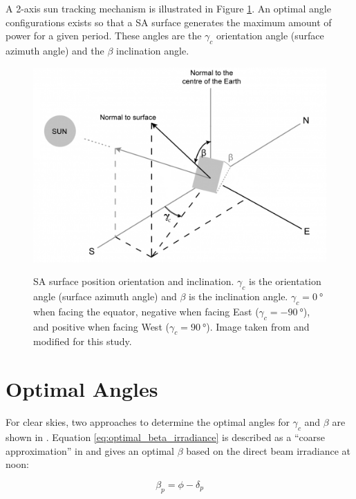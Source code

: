 A 2-axis sun tracking mechanism is illustrated in Figure \ref{fig:tilted-surface-sun-tracking}. An optimal angle configurations exists so that a \ac{SA} surface generates the maximum amount of power for a given period. These angles are the $\gamma_{c}$ orientation angle (surface azimuth angle) and the $\beta$ inclination angle.

\begin{figure}[h]
  \centering
  \hypersetup{linkcolor=captionTextColor}
  \includegraphics[width=0.7\linewidth]{sections/appendix/optimal-angles/images/beta-and-gamma-angles-on-tilted-surface.png}\\
  \caption[\ac{SA} surface position orientation and inclination]
          {\ac{SA} surface position orientation and inclination. $\gamma_{c}$ is the orientation angle (surface azimuth angle) and $\beta$ is the inclination angle. $\gamma_{c} = \SI{0}{\degree}$ when facing the equator, negative when facing East ($\gamma_{c} = \SI{-90}{\degree}$), and positive when facing West ($\gamma_{c} = \SI{+90}{\degree}$). Image taken from  and modified for this study.}
  \label{fig:tilted-surface-sun-tracking}
\end{figure}

\section{Optimal Angles}
For clear skies, two approaches to determine the optimal angles for $\gamma_{c}$ and $\beta$ are shown in . Equation \ref{eq:optimal_beta_irradiance} is described as a ``coarse approximation'' in  and gives an optimal $\beta$ based on the direct beam irradiance at noon:

\begin{equation}
  \label{eq:optimal_beta_irradiance}
  \beta_{p} = \phi - \delta_{p}
\end{equation}

